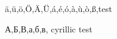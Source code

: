 \documentclass{article}
\begin{document}
ä,ü,ö,Ö,Ä,Ü,á,é,ó,à,ù,ò,ß,test

А,Б,В,а,б,в, cyrillic test
\end{document}
